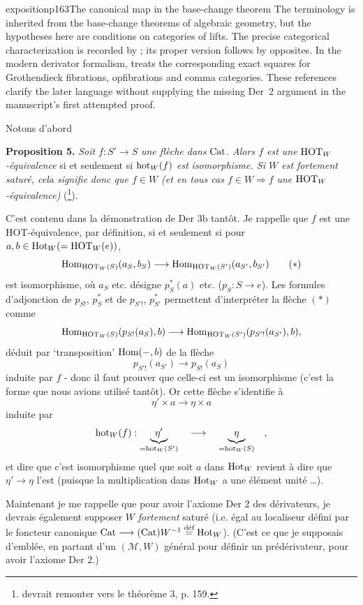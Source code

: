 \begin{dcomment}{exposition}{p163}{The canonical map in the base-change theorem}
The terminology is inherited from the base-change theorems of algebraic geometry, but the hypotheses here are conditions on categories of lifts. The precise categorical characterization is recorded by \citet[Theorem~1.2]{Maltsiniotis2005Asphericite}; its proper version follows by opposites. In the modern derivator formalism, \citet[Propositions~1.24 and~1.26]{Groth2013} treats the corresponding exact squares for Grothendieck fibrations, opfibrations and comma categories. These references clarify the later language without supplying the missing Der~2 argument in the manuscript's first attempted proof.
\end{dcomment}


\noindent{}%
Notons d'abord

\noindent\textbf{Proposition 5.} \textit{Soit} $f : S' \longrightarrow S$ \textit{une flèche dans} $\mathrm{Cat}$. \textit{Alors $f$ est une} $\mathrm{HOT}_W$\textit{-équivalence} si et seulement si $\mathrm{hot}_W(f)$ \textit{est} \textit{isomorphisme. Si $W$ est fortement saturé, cela signifie donc que $f \in W$ (et en tous cas $f \in W \Longrightarrow f$} \textit{une} $\mathrm{HOT}_W$\textit{-équivalence)} (\footnote[81]{devrait remonter vers le théorème 3, p. 159.}).

C'est contenu dans la démonstration de Der 3b tantôt. Je rappelle que $f$ est une HOT-équivalence, par définition, si et seulement si pour $a, b \in \mathrm{Hot}_W (= \mathrm{HOT}_W(e))$,
\[
\mathrm{Hom}_{\mathrm{HOT}_W(S)}(a_S, b_S) \longrightarrow \mathrm{Hom}_{\mathrm{HOT}_W(S')}(a_{S'}, b_{S'}) \tag*{$(*)$}
\]
est isomorphisme, où $a_S$ etc. désigne $p_S^*(a)$ etc. ($p_S : S \longrightarrow e$). Les formules d'adjonction de $p_{S!}$, $p_S^*$ et de $p_{S'!}$, $p_{S'}^*$ permettent d'interpréter la flèche $(*)$ comme
\[
\mathrm{Hom}_{\mathrm{HOT}_W(S)}(p_{S!}(a_S), b) \longrightarrow \mathrm{Hom}_{\mathrm{HOT}_W(S')}(p_{S'!}(a_{S'}), b),
\]
déduit par ‘transposition’ $\mathrm{Hom}(-, b)$ de la flèche
\[
p_{S'!}(a_{S'}) \longrightarrow p_{S!}(a_S)
\]
induite par $f$ - donc il faut prouver que celle-ci est un isomorphisme (c'est la forme que nous avions utilisé tantôt). Or cette flèche s'identifie à
\[
\eta' \times a \longrightarrow \eta \times a
\]
induite par
\[
\mathrm{hot}_W(f) : \underbrace{\eta'}_{= \mathrm{hot}_W(S')} \quad \longrightarrow \quad \underbrace{\eta}_{= \mathrm{hot}_W(S)} \quad ,
\]
et dire que c'est isomorphisme quel que soit $a$ dans $\mathrm{Hot}_W$ revient à dire que $\eta' \longrightarrow \eta$ l'est (puisque la multiplication dans $\mathrm{Hot}_W$ a une élément unité \dots). %

Maintenant je me rappelle que pour avoir l'axiome Der 2 des dérivateurs, je devrais également supposer $W$ \textit{fortement} saturé (i.e. égal au localiseur défini par le foncteur canonique $\mathrm{Cat} \longrightarrow (\mathrm{Cat})W^{-1} \overset{\text{déf}}{=} \mathrm{Hot}_W$). (C'est ce que je supposais d'emblée, en partant d'un $(\mathcal{M}, W)$ général pour définir un prédérivateur, pour avoir l'axiome Der 2.)

